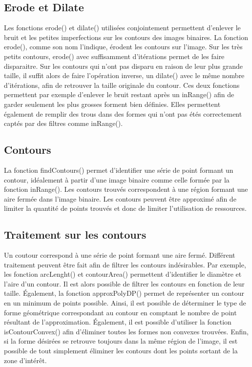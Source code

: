 \subsection{Erode et Dilate}

Les fonctions erode() et dilate() utilisées conjointement permettent d'enlever le bruit et les petites imperfections sur les contours des images binaires. La fonction erode(), comme son nom l'indique, érodent les contours sur l'image. Sur les très petits contours, erode() avec suffisamment d'itérations permet de les faire disparaitre. Sur les contours qui n'ont pas disparu en raison de leur plus grande taille, il suffit alors de faire l'opération inverse, un dilate() avec le même nombre d'itérations, afin de retrouver la taille originale du contour. Ces deux fonctions permettent par exemple d'enlever le bruit restant après un inRange() afin de garder seulement les plus grosses forment bien définies. Elles permettent également de remplir des trous dans des formes qui n'ont pas étés correctement captés par des filtres comme inRange().

\subsection{Contours}

La fonction findContours() permet d'identifier une série de point formant un contour, idéalement à partir d'une image binaire comme celle formée par la fonction inRange(). Les contours trouvés correspondent à une région formant une aire fermée dans l'image binaire. Les contours peuvent être approximé afin de limiter la quantité de points trouvés et donc de limiter l'utilisation de ressources.

\subsection{Traitement sur les contours}

Un coutour correspond à une série de point formant une aire fermé. Différent traitement peuvent être fait afin de filtrer les contours indésirables. Par exemple, les fonction arcLenght() et contourArea() permettent d'identifier le diamètre et l'aire d'un contour. Il est alors possible de filtrer les contours en fonction de leur taille. Également, la fonction approxPolyDP() permet de représenter un contour en un minimum de points possible. Ainsi, il est possible de déterminer le type de forme géométrique correspondant au contour en comptant le nombre de point résultant de l'approximation. Également, il est possible d'utiliser la fonction isContourConvex() afin d'éliminer toutes les formes non convexes trouvées. Enfin, si la forme désirées se retrouve toujours dans la même région de l'image, il est possible de tout simplement éliminer les contours dont les points sortant de la zone d'intérêt.

